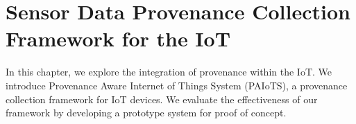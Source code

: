 
\chapter{Sensor Data Provenance Collection Framework for the IoT}

In this chapter, we explore the integration of provenance within the IoT.
We introduce Provenance Aware Internet of Things System (PAIoTS), a  provenance collection framework for IoT devices. We evaluate the effectiveness
of our framework by developing a prototype system for proof of concept.

